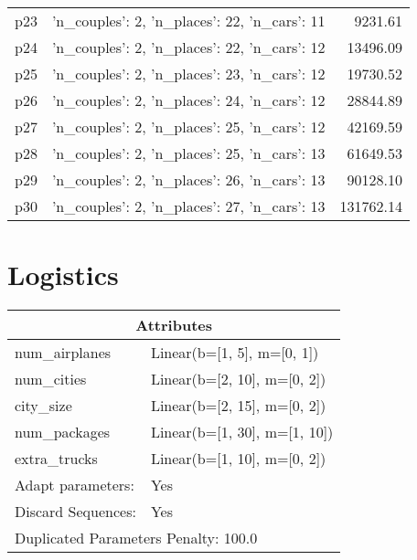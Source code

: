 \documentclass{article}
\begin{document}
\begin{center}
\begin{tabular}{@{}l|r|r@{}}
  p23&{'n\_couples': 2, 'n\_places': 22, 'n\_cars': 11}&9231.61\\
  p24&{'n\_couples': 2, 'n\_places': 22, 'n\_cars': 12}&13496.09\\
  p25&{'n\_couples': 2, 'n\_places': 23, 'n\_cars': 12}&19730.52\\
  p26&{'n\_couples': 2, 'n\_places': 24, 'n\_cars': 12}&28844.89\\
  p27&{'n\_couples': 2, 'n\_places': 25, 'n\_cars': 12}&42169.59\\
  p28&{'n\_couples': 2, 'n\_places': 25, 'n\_cars': 13}&61649.53\\
  p29&{'n\_couples': 2, 'n\_places': 26, 'n\_cars': 13}&90128.10\\
  p30&{'n\_couples': 2, 'n\_places': 27, 'n\_cars': 13}&131762.14
                            \end{tabular}
                            \end{center}
                    
                            \newpage \section{Logistics}
                    \begin{center}
                    \begin{tabular}{@{}p{}p{}@{}}
                    \multicolumn{2}{c}{\bf \large Attributes}\\\midrule
                    num\_airplanes & Linear(b=[1, 5], m=[0, 1])\\
num\_cities & Linear(b=[2, 10], m=[0, 2])\\
city\_size & Linear(b=[2, 15], m=[0, 2])\\
num\_packages & Linear(b=[1, 30], m=[1, 10])\\
extra\_trucks & Linear(b=[1, 10], m=[0, 2])
                    \\\midrule
                    Adapt parameters: & Yes
                                \\\midrule
                                Discard Sequences: & Yes \\\midrule
                    \multicolumn{2}{l}{Duplicated Parameters Penalty: 100.0}
                    \end{tabular}
                    \end{center}
                
\end{document}
